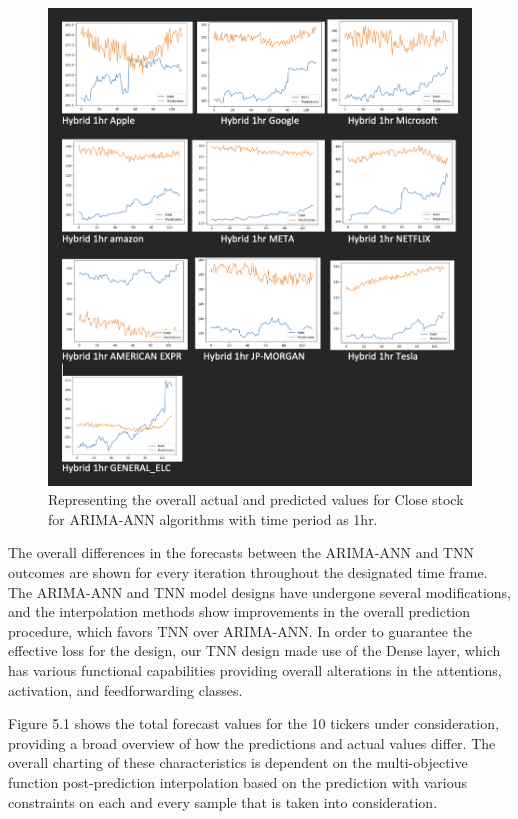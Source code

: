 \begin{figure}[ht]
    \centering
    \includegraphics[scale=0.2]{figures/Hybrid 1hr.png}
    \caption{Representing the overall actual and predicted values for Close stock for ARIMA-ANN algorithms with time period as 1hr.}
    \label{fig:chart_d}
\end{figure}

The overall differences in the forecasts between the ARIMA-ANN and TNN outcomes are shown for every iteration throughout the designated time frame. The ARIMA-ANN and TNN model designs have undergone several modifications, and the interpolation methods show improvements in the overall prediction procedure, which favors TNN over ARIMA-ANN. In order to guarantee the effective loss for the design, our TNN design made use of the Dense layer, which has various functional capabilities providing overall alterations in the attentions, activation, and feedforwarding classes.

Figure 5.1 shows the total forecast values for the 10 tickers under consideration, providing a broad overview of how the predictions and actual values differ. The overall charting of these characteristics is dependent on the multi-objective function post-prediction interpolation based on the prediction with various constraints on each and every sample that is taken into consideration.


